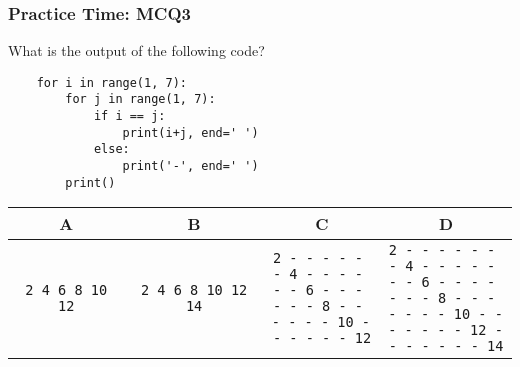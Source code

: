 \documentclass{beamer}
\begin{document}
\begin{frame}[fragile]
    \frametitle{Practice Time: MCQ3}
    \begin{small}
        What is the output of the following code?

        \begin{verbatim}
    for i in range(1, 7):
        for j in range(1, 7):
            if i == j:
                print(i+j, end=' ')
            else:
                print('-', end=' ')
        print()
        \end{verbatim}

        \begin{tabular}{|c|c|c|c|}
            \hline
            A                         & B & C & D \\\hline
            \texttt{2 4 6 8 10 12}    &
            \texttt{2 4 6 8 10 12 14} &
            \makecell[tl]{
            \texttt{2 - - - - - }                 \\
            \texttt{- 4 - - - - }                 \\
            \texttt{- - 6 - - - }                 \\
            \texttt{- - - 8 - - }                 \\
            \texttt{- - - - 10 - }                \\
            \texttt{- - - - - 12}                 \\
            }                         &
            \makecell[tl]{
            \texttt{2 - - - - - - }               \\
            \texttt{- 4 - - - - - }               \\
            \texttt{- - 6 - - - - }               \\
            \texttt{- - - 8 - - - }               \\
            \texttt{- - - - 10 - - }              \\
            \texttt{- - - - - 12 - }              \\
            \texttt{- - - - - - 14}               \\
            }                                     \\\hline
        \end{tabular}
    \end{small}
\end{frame}
\end{document}
